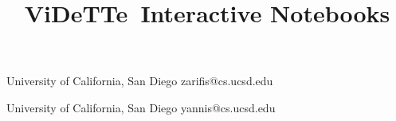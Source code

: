 \documentclass[numbers]{sigplanconf}
\begin{document}
\sectionfont{\MakeUppercase}

\newcommand{\projname}[0]{ViDeTTe}
\newcommand{\angular}[0]{AngularJS}
\newcommand{\react}[0]{React}

\title{\projname\ Interactive Notebooks}

           {University of California, San Diego}
           {zarifis@cs.ucsd.edu}
           
           {University of California, San Diego}
           {yannis@cs.ucsd.edu}
                      
\maketitle



 

\begin{sloppypar}

%
%
%


%
%


%
%


%

%
%

%


%
%

%

%


%

%

%



%





%
%

\end{sloppypar}



{
\scriptsize 

}


%
%

%
\end{document}
